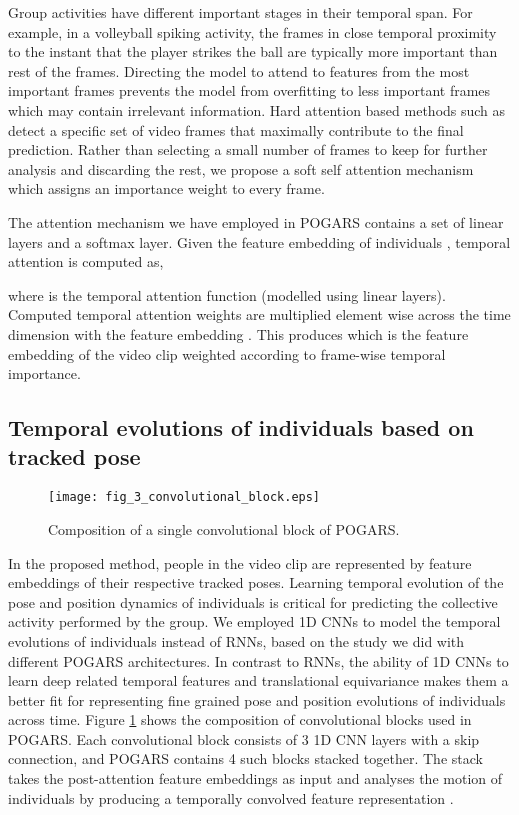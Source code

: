 \documentclass[a4paper,fleqn]{cas-dc}
\begin{document}
Group activities have different important stages in their temporal span. 
For example, in a volleyball spiking activity, the frames in close temporal proximity to the instant that the player strikes the ball are typically more important than rest of the frames. 
Directing the model to attend to features from the most important frames prevents the model from overfitting to less important frames which may contain irrelevant information. 
Hard attention based methods such as \cite{varona2000_automaticKeyFrame,Yan2018_deepKeyFrame} detect a specific set of video frames that maximally contribute to the final prediction. 
Rather than selecting a small number of frames to keep for further analysis and discarding the rest, we propose a soft self attention mechanism which assigns an importance weight to every frame.

The attention mechanism we have employed in POGARS contains a set of linear layers and a softmax layer.
Given the feature embedding of individuals  , temporal attention is computed as,



where  is the temporal attention function (modelled using linear layers).
Computed temporal attention weights are multiplied element wise across the time dimension with the feature embedding .
This produces \textit{}which is the feature embedding of the video clip weighted according to frame-wise temporal importance.

\subsection{Temporal evolutions of individuals based on tracked pose}
\label{ssec:temporal-evolutions-individuals}

\begin{figure}[pos=t]
  \centering
  \texttt{[image: fig\_3\_convolutional\_block.eps]}
  \caption{Composition of a single convolutional block of POGARS.}
  \label{fig:convolutional-block}
\end{figure}

In the proposed method, people in the video clip are represented by feature embeddings of their respective tracked poses. 
Learning temporal evolution of the pose and position dynamics of individuals is critical for predicting the collective activity performed by the group. 
We employed 1D CNNs to model the temporal evolutions of individuals instead of RNNs, based on the study we did with different POGARS architectures. 
In contrast to RNNs, the ability of 1D CNNs to learn deep related temporal features and translational equivariance makes them a better fit for representing fine grained pose and position evolutions of individuals across time. 
Figure \ref{fig:convolutional-block} shows the composition of convolutional blocks used in POGARS.
Each convolutional block consists of 3 1D CNN layers with a skip connection, and POGARS contains 4 such blocks stacked together.
The stack takes the post-attention feature embeddings  as input and analyses the motion of individuals by producing a temporally convolved feature representation {}.
\end{document}
